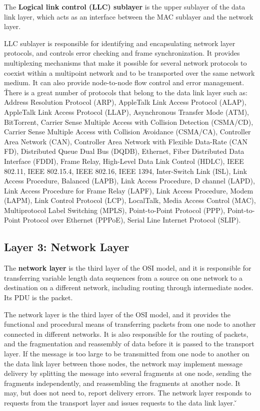 The \textbf{Logical link control (LLC) sublayer} is the upper sublayer of the data link layer, which acts as an
interface between the MAC sublayer and the network layer.
\ed

LLC sublayer is responsible for identifying and encapsulating network layer protocols, and controls error checking
and frame synchronization. It provides multiplexing mechanisms that make it possible for several network protocols to
coexist within a multipoint network and to be transported over the same network medium. It can also provide
node-to-node flow control and error management. \v

There is a great number of protocols that belong to the data link layer such as: Address Resolution Protocol (ARP),
AppleTalk Link Access Protocol (ALAP), AppleTalk Link Access Protocol (LLAP), Asynchronous Transfer Mode (ATM),
BitTorrent, Carrier Sense Multiple Access with Collision Detection (CSMA/CD), Carrier Sense Multiple Access with
Collision Avoidance (CSMA/CA), Controller Area Network (CAN), Controller Area Network with Flexible Data-Rate (CAN
FD), Distributed Queue Dual Bus (DQDB), Ethernet, Fiber Distributed Data Interface (FDDI), Frame Relay, High-Level
Data Link Control (HDLC), IEEE 802.11, IEEE 802.15.4, IEEE 802.16, IEEE 1394, Inter-Switch Link (ISL), Link Access
Procedure, Balanced (LAPB), Link Access Procedure, D channel (LAPD), Link Access Procedure for Frame Relay (LAPF),
Link Access Procedure, Modem (LAPM), Link Control Protocol (LCP), LocalTalk, Media Access Control (MAC), Multiprotocol
Label Switching (MPLS), Point-to-Point Protocol (PPP), Point-to-Point Protocol over Ethernet (PPPoE), Serial Line
Internet Protocol (SLIP).

\subsection{Layer 3: Network Layer}

The \textbf{network layer} is the third layer of the OSI model, and it is responsible for transferring variable length
data sequences from a source on one network to a destination on a different network, including routing through
intermediate nodes. Its PDU is the packet.
\ed

The network layer is the third layer of the OSI model, and it provides the functional and procedural means of
transferring packets from one node to another connected in different networks. It is also responsible for the routing
of packets, and the fragmentation and reassembly of data before it is passed to the transport layer. If the message
is too large to be transmitted from one node to another on the data link layer between those nodes, the network may
implement message delivery by splitting the message into several fragments at one node, sending the fragments
independently, and reassembling the fragments at another node. It may, but does not need to, report delivery errors. The
network layer responds to requests from the transport layer and issues requests to the data link layer.
\v

